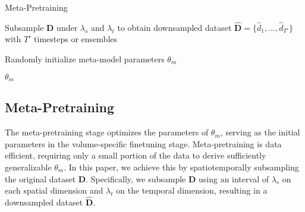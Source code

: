 \begin{algorithm}[htb]
    \caption{Meta-Pretraining}
    \label{alg:meta-pretraining}
        Subsample $\mathbf{D}$ under $\lambda_s$ and $\lambda_t$ to obtain downsampled dataset $\hat{\mathbf{D}} = \{ \hat{d}_1, \dots, \hat{d}_{T'} \}$ with $T'$ timesteps or ensembles
        
        Randomly initialize meta-model parameters $\theta_{m}$
        
        \Return $\theta_{m}$
\end{algorithm}

\vspace{-0.05in}
\subsection{Meta-Pretraining}
\label{subsec:mp}

The meta-pretraining stage optimizes the parameters of $\theta_{m}$, serving as the initial parameters in the volume-specific finetuning stage. 
Meta-pretraining is data efficient, requiring only a small portion of the data to derive sufficiently generalizable $\theta_{m}$.
In this paper, we achieve this by spatiotemporally subsampling the original dataset $\mathbf{D}$.
Specifically, we subsample $\mathbf{D}$ using an interval of $\lambda_s$ on each spatial dimension and $\lambda_t$ on the temporal dimension, resulting in a downsampled dataset $\hat{\mathbf{D}}$.

